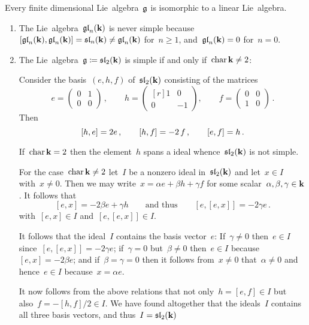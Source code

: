\begin{theorem}[Ado]
  Every finite dimensional Lie~algebra~$\mathfrak{g}$ is isomorphic to a linear Lie~algebra.
\end{theorem}


\begin{examples}
  \leavevmode
  \begin{enumerate}
    \item
      The Lie~algebra~$\mathfrak{gl}_n(\mathbf{k})$ is never simple because~$[\mathfrak{gl}_n(\mathbf{k}), \mathfrak{gl}_n(\mathbf{k})] = \mathfrak{sl}_n(\mathbf{k}) \neq \mathfrak{gl}_n(\mathbf{k})$ for~$n \geq 1$, and~$\mathfrak{gl}_n(\mathbf{k}) = 0$ for~$n = 0$.
    \item
      The Lie~algebra~$\mathfrak{g} \coloneqq \mathfrak{sl}_2(\mathbf{k})$ is simple if and only if~$\operatorname{char} \mathbf{k} \neq 2$:
      
      Consider the basis~$(e,h,f)$ of~$\mathfrak{sl}_2(\mathbf{k})$ consisting of the matrices
      \[
        e
        =
        \begin{pmatrix}
          0 & 1 \\
          0 & 0
        \end{pmatrix} \,,
        \qquad
        h
        =
        \begin{pmatrix*}[r]
          1 &  0  \\
          0 & -1
        \end{pmatrix*},
        \qquad
        f
        =
        \begin{pmatrix}
          0 & 0 \\
          1 & 0
        \end{pmatrix} \,.
      \]
      Then
      \[
        [h,e] = 2e  \,,
        \qquad
        [h,f] = -2 \, f \,,
        \qquad
        [e,f] = h \,.
      \]
      
      If~$\operatorname{char} \mathbf{k} = 2$ then the element~$h$ spans a {\onedimensional} ideal whence~$\mathfrak{sl}_2(\mathbf{k})$ is not simple.
      
      For the case~$\operatorname{char} \mathbf{k} \neq 2$ let~$I$ be a nonzero ideal in~$\mathfrak{sl}_2(\mathbf{k})$ and let~$x \in I$ with~$x \neq 0$.
      Then we may write~$x = \alpha e + \beta h + \gamma f$ for some scalar~$\alpha, \beta, \gamma \in \mathbf{k}$.
      It follows that
      \[
        [e,x]
        =
        -2 \beta e + \gamma h
        \qquad \text{and thus}\qquad
        [e,[e,x]]
        =
        -2 \gamma e \,.
      \]
      with~$[e,x] \in I$ and~$[e,[e,x]] \in I$.
      
      It follows that the ideal~$I$ contains the basis vector~$e$:
      If~$\gamma \neq 0$ then~$e \in I$ since~$[e,[e,x]] = -2 \gamma e$;
      if~$\gamma = 0$ but~$\beta \neq 0$ then~$e \in I$ because~$[e,x] = -2 \beta e$;
      and if~$\beta = \gamma = 0$ then it follows from~$x \neq 0$ that~$\alpha \neq 0$ and hence~$e \in I$ because~$x = \alpha e$.
      
      It now follows from the above relations that not only~$h = [e,f] \in I$ but also~$f = -[h,f]/2 \in I$.
      We have found altogether that the ideals~$I$ contains all three basis vectors, and thus~$I = \mathfrak{sl}_2(\mathbf{k})$
  \end{enumerate}
\end{examples}


